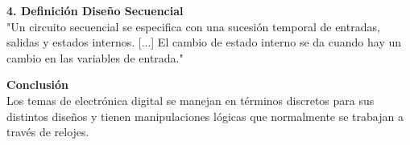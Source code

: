 \documentclass[12pt]{article}
\begin{document}
\vspace{.35cm}

\large\textbf{4. Definición Diseño Secuencial} \\
\normalsize "Un circuito secuencial se especifica con una sucesión temporal de entradas, salidas y estados internos. [...] El cambio de estado interno se da cuando hay un cambio en las variables de entrada." \cite{mano}

\vspace{.35cm}

\large \textbf{Conclusión} \\
\normalsize Los temas de electrónica digital se manejan en términos discretos para sus distintos diseños y tienen manipulaciones lógicas que normalmente se trabajan a través de relojes.




\newpage


\end{document}
